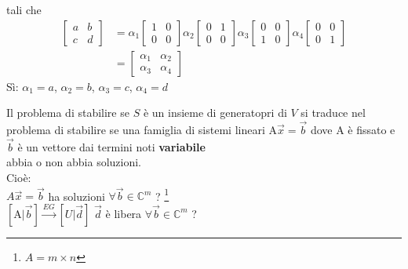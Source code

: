 \begin{enumerate}
        tali che
        \begin{align*}
            \begin{bmatrix}
                a & b \\
                c & d
            \end{bmatrix}
            & = 
            \alpha_1
            \begin{bmatrix}
                1 & 0\\
                0 & 0
            \end{bmatrix}
            \alpha_2
            \begin{bmatrix}
                0 & 1\\
                0 & 0
            \end{bmatrix}
            \alpha_3
            \begin{bmatrix}
                0 & 0\\
                1 & 0
            \end{bmatrix}
            \alpha_4
            \begin{bmatrix}
                0 & 0\\
                0 & 1
            \end{bmatrix}
            \\
            & = 
            \begin{bmatrix}
                \alpha_1 & \alpha_2\\
                \alpha_3 & \alpha_4
            \end{bmatrix}
        \end{align*}
        Sì: $\alpha_1=a$, $\alpha_2=b$, $\alpha_3=c$, $\alpha_4=d$
\end{enumerate}
{\color{red}
    Il problema di stabilire se $S$ è un insieme di generatopri di $V$ si traduce
    nel problema di stabilire se una famiglia di sistemi lineari A$\vec{x}=\vec{b}$ 
    dove A è fissato e $\vec{b}$ è un vettore dai termini noti \textbf{variabile}\\
    abbia o non abbia soluzioni. \\
}
Cioè:\\
$A\vec{x}=\vec{b}$ ha soluzioni {\color{red}$\forall\vec{b}\in\mathbb{C}^m$} ?
\footnote{ 
$A = m\times n$
}\\
$[\textrm{A}|\vec{b}] \overset{EG}{\rightarrow}[U|\vec{d}]$
{\color{red}$\vec{d}$ è libera $\forall\vec{b}\in\mathbb{C}^m$} ?

